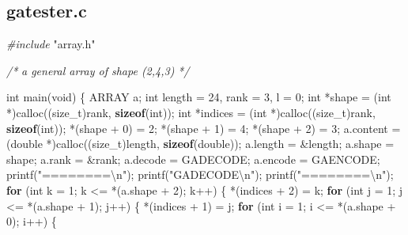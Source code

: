 \documentclass[
  12pt,
]{article}
\newenvironment{Shaded}{\begin{snugshade}}{\end{snugshade}}
\newcommand{\CommentTok}[1]{\textcolor[rgb]{0.56,0.35,0.01}{\textit{#1}}}
\newcommand{\ControlFlowTok}[1]{\textcolor[rgb]{0.13,0.29,0.53}{\textbf{#1}}}
\newcommand{\DataTypeTok}[1]{\textcolor[rgb]{0.13,0.29,0.53}{#1}}
\newcommand{\DecValTok}[1]{\textcolor[rgb]{0.00,0.00,0.81}{#1}}
\newcommand{\ImportTok}[1]{#1}
\newcommand{\KeywordTok}[1]{\textcolor[rgb]{0.13,0.29,0.53}{\textbf{#1}}}
\newcommand{\NormalTok}[1]{#1}
\newcommand{\PreprocessorTok}[1]{\textcolor[rgb]{0.56,0.35,0.01}{\textit{#1}}}
\newcommand{\SpecialCharTok}[1]{\textcolor[rgb]{0.00,0.00,0.00}{#1}}
\newcommand{\StringTok}[1]{\textcolor[rgb]{0.31,0.60,0.02}{#1}}
\begin{document}
\hypertarget{gatester.c}{%
\subsection{gatester.c}\label{gatester.c}}

\begin{Shaded}
\begin{Highlighting}[]
\PreprocessorTok{\#include }\ImportTok{"array.h"}

\CommentTok{/*}
\CommentTok{  a general array of shape (2,4,3)}
\CommentTok{*/}

\DataTypeTok{int}\NormalTok{ main(}\DataTypeTok{void}\NormalTok{) \{}
\NormalTok{  ARRAY a;}
  \DataTypeTok{int}\NormalTok{ length = }\DecValTok{24}\NormalTok{, rank = }\DecValTok{3}\NormalTok{, l = }\DecValTok{0}\NormalTok{;}
  \DataTypeTok{int}\NormalTok{ *shape = (}\DataTypeTok{int}\NormalTok{ *)calloc((}\DataTypeTok{size\_t}\NormalTok{)rank, }\KeywordTok{sizeof}\NormalTok{(}\DataTypeTok{int}\NormalTok{));}
  \DataTypeTok{int}\NormalTok{ *indices = (}\DataTypeTok{int}\NormalTok{ *)calloc((}\DataTypeTok{size\_t}\NormalTok{)rank, }\KeywordTok{sizeof}\NormalTok{(}\DataTypeTok{int}\NormalTok{));}
\NormalTok{  *(shape + }\DecValTok{0}\NormalTok{) = }\DecValTok{2}\NormalTok{;}
\NormalTok{  *(shape + }\DecValTok{1}\NormalTok{) = }\DecValTok{4}\NormalTok{;}
\NormalTok{  *(shape + }\DecValTok{2}\NormalTok{) = }\DecValTok{3}\NormalTok{;}
\NormalTok{  a.content = (}\DataTypeTok{double}\NormalTok{ *)calloc((}\DataTypeTok{size\_t}\NormalTok{)length, }\KeywordTok{sizeof}\NormalTok{(}\DataTypeTok{double}\NormalTok{));}
\NormalTok{  a.length = \&length;}
\NormalTok{  a.shape = shape;}
\NormalTok{  a.rank = \&rank;}
\NormalTok{  a.decode = GADECODE;}
\NormalTok{  a.encode = GAENCODE;}
\NormalTok{  printf(}\StringTok{"========}\SpecialCharTok{\textbackslash{}n}\StringTok{"}\NormalTok{);}
\NormalTok{  printf(}\StringTok{"GADECODE}\SpecialCharTok{\textbackslash{}n}\StringTok{"}\NormalTok{);}
\NormalTok{  printf(}\StringTok{"========}\SpecialCharTok{\textbackslash{}n}\StringTok{"}\NormalTok{);}
  \ControlFlowTok{for}\NormalTok{ (}\DataTypeTok{int}\NormalTok{ k = }\DecValTok{1}\NormalTok{; k \textless{}= *(a.shape + }\DecValTok{2}\NormalTok{); k++) \{}
\NormalTok{    *(indices + }\DecValTok{2}\NormalTok{) = k;}
    \ControlFlowTok{for}\NormalTok{ (}\DataTypeTok{int}\NormalTok{ j = }\DecValTok{1}\NormalTok{; j \textless{}= *(a.shape + }\DecValTok{1}\NormalTok{); j++) \{}
\NormalTok{      *(indices + }\DecValTok{1}\NormalTok{) = j;}
      \ControlFlowTok{for}\NormalTok{ (}\DataTypeTok{int}\NormalTok{ i = }\DecValTok{1}\NormalTok{; i \textless{}= *(a.shape + }\DecValTok{0}\NormalTok{); i++) \{}

\end{Highlighting}
\end{Shaded}
\end{document}
